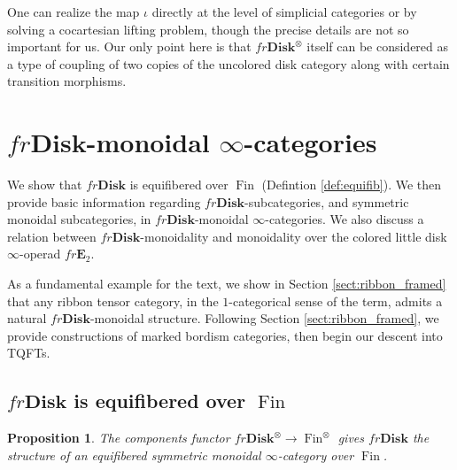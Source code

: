 \documentclass[reqno]{amsart}
\newtheorem{proposition}[lemma]{Proposition}
\theoremstyle{definition}
\newcommand{\ot}{\otimes}
\newcommand{\E}{\mathbf{E}}
\newcommand{\Disk}{\mathbf{Disk}}
\DeclareMathOperator{\Fin}{Fin}
\renewcommand{\1}{\mathbf{1}}
\begin{document}
One can realize the map $\iota$ directly at the level of simplicial categories or by solving a cocartesian lifting problem, though the precise details are not so important for us. Our only point here is that $fr\Disk^{\ot}$ itself can be considered as a type of coupling of two copies of the uncolored disk category along with certain transition morphisms.

\section{$fr\Disk$-monoidal $\infty$-categories}
\label{sect:disk_monoidal}

We show that $fr\Disk$ is equifibered over $\Fin$ (Defintion \ref{def:equifib}). We then provide basic information regarding $fr\Disk$-subcategories, and symmetric monoidal subcategories, in $fr\Disk$-monoidal $\infty$-categories. We also discuss a relation between $fr\Disk$-monoidality and monoidality over the colored little disk $\infty$-operad $fr\E_2$.

As a fundamental example for the text, we show in Section \ref{sect:ribbon_framed} that any ribbon tensor category, in the $1$-categorical sense of the term, admits a natural $fr\Disk$-monoidal structure. Following Section \ref{sect:ribbon_framed}, we provide constructions of marked bordism categories, then begin our descent into TQFTs.

\subsection{$fr\Disk$ is equifibered over $\Fin$}

\begin{proposition}\label{prop:frdisks_efib}
The components functor $fr\Disk^{\ot}\to \Fin^{\ot}$ gives $fr\Disk$ the structure of an equifibered symmetric monoidal $\infty$-category over $\Fin$.
\end{proposition}
\end{document}
